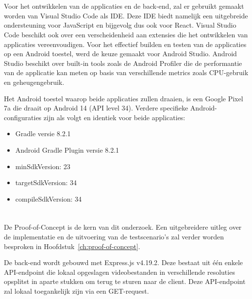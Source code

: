 \section{}%
\label{sec:omgeving-opzetten}

Voor het ontwikkelen van de applicaties en de back-end, zal er gebruikt gemaakt worden van Visual Studio Code als IDE. Deze IDE biedt namelijk een uitgebreide ondersteuning voor JavaScript en bijgevolg dus ook voor React. Visual Studio Code beschikt ook over een verscheidenheid aan extensies die het ontwikkelen van applicaties vereenvoudigen. Voor het effectief builden en testen van de applicaties op een Android toestel, werd de keuze gemaakt voor Android Studio. Android Studio beschikt over built-in tools zoals de Android Profiler die de performantie van de applicatie kan meten op basis van verschillende metrics zoals CPU-gebruik en geheugengebruik.

Het Android toestel waarop beide applicaties zullen draaien, is een Google Pixel 7a die draait op Android 14 (API level 34). Verdere specifieke Android-configuraties zijn als volgt en identiek voor beide applicaties:
\begin{itemize}
    \item Gradle versie 8.2.1
    \item Android Gradle Plugin versie 8.2.1
    \item minSdkVersion: 23
    \item targetSdkVersion: 34
    \item compileSdkVersion: 34
\end{itemize}


\section{}%
\label{sec:proof-of-concept}

De Proof-of-Concept is de kern van dit onderzoek. Een uitgebreidere uitleg over de implementatie en de uitvoering van de testscenario's zal verder worden besproken in Hoofdstuk~\ref{ch:proof-of-concept}.

De back-end wordt gebouwd met Express.js v4.19.2. Deze bestaat uit één enkele API-endpoint die lokaal opgeslagen videobestanden in verschillende resoluties opsplitst in aparte stukken om terug te sturen naar de client. Deze API-endpoint zal lokaal toegankelijk zijn via een GET-request.

